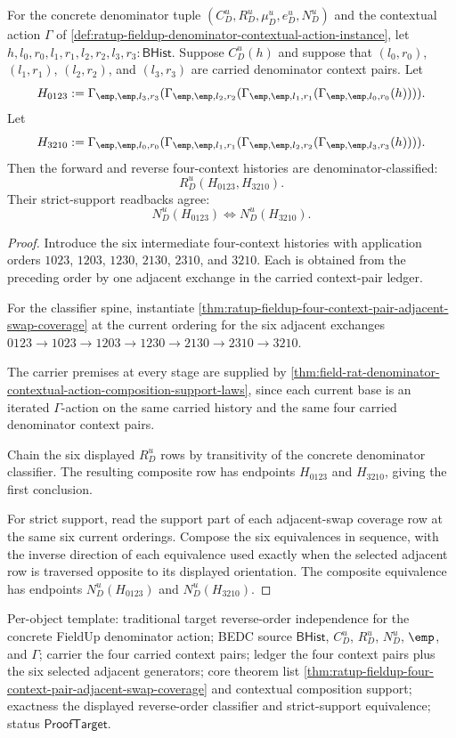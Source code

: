 \begin{theorem}
\label{thm:ratup-fieldup-four-context-pair-full-reverse-order-coherence}
For the concrete denominator tuple
$(C_D^u,R_D^u,\mu_D^u,e_D^u,N_D^u)$ and the contextual action $\Gamma$ of
\autoref{def:ratup-fieldup-denominator-contextual-action-instance}, let
$h,l_0,r_0,l_1,r_1,l_2,r_2,l_3,r_3:\mathsf{BHist}$. Suppose $C_D^u(h)$ and
suppose that $(l_0,r_0)$, $(l_1,r_1)$, $(l_2,r_2)$, and $(l_3,r_3)$ are
carried denominator context pairs. Let
$$
H_{0123}:=
\Gamma_{\emp,\emp,l_3,r_3}
(\Gamma_{\emp,\emp,l_2,r_2}
(\Gamma_{\emp,\emp,l_1,r_1}
(\Gamma_{\emp,\emp,l_0,r_0}(h)))).
$$
Let
$$
H_{3210}:=
\Gamma_{\emp,\emp,l_0,r_0}
(\Gamma_{\emp,\emp,l_1,r_1}
(\Gamma_{\emp,\emp,l_2,r_2}
(\Gamma_{\emp,\emp,l_3,r_3}(h)))).
$$
Then the forward and reverse four-context histories are denominator-classified:
$$
R_D^u(H_{0123},H_{3210}).
$$
Their strict-support readbacks agree:
$$
N_D^u(H_{0123})
\Longleftrightarrow
N_D^u(H_{3210}).
$$
\end{theorem}
\begin{proof}
Introduce the six intermediate four-context histories with application orders
$1023$, $1203$, $1230$, $2130$, $2310$, and $3210$. Each is obtained from the
preceding order by one adjacent exchange in the carried context-pair ledger.

For the classifier spine, instantiate
\autoref{thm:ratup-fieldup-four-context-pair-adjacent-swap-coverage} at the
current ordering for the six adjacent exchanges
$0123 \to 1023 \to 1203 \to 1230 \to 2130 \to 2310 \to 3210$.

The carrier premises at every stage are supplied by
\autoref{thm:field-rat-denominator-contextual-action-composition-support-laws},
since each current base is an iterated $\Gamma$-action on the same carried
history and the same four carried denominator context pairs.

Chain the six displayed $R_D^u$ rows by transitivity of the concrete
denominator classifier. The resulting composite row has endpoints
$H_{0123}$ and $H_{3210}$, giving the first conclusion.

For strict support, read the support part of each adjacent-swap coverage row
at the same six current orderings. Compose the six equivalences in sequence,
with the inverse direction of each equivalence used exactly when the selected
adjacent row is traversed opposite to its displayed orientation. The composite
equivalence has endpoints $N_D^u(H_{0123})$ and $N_D^u(H_{3210})$.
\end{proof}

Per-object template: traditional target reverse-order independence for the
concrete FieldUp denominator action; BEDC source $\mathsf{BHist}$, $C_D^u$,
$R_D^u$, $N_D^u$, $\emp$, and $\Gamma$; carrier the four carried context pairs;
ledger the four context pairs plus the six selected adjacent generators;
core theorem list
\autoref{thm:ratup-fieldup-four-context-pair-adjacent-swap-coverage} and
contextual composition support; exactness the displayed reverse-order
classifier and strict-support equivalence; status $\mathsf{ProofTarget}$.
